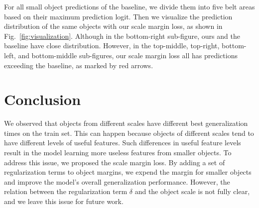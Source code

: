 \documentclass{article}
\begin{document}
For all small object predictions of the baseline, we divide them into five belt areas based on their maximum prediction logit. Then we visualize the prediction distribution of the same objects with our scale margin loss, as shown in Fig.~\ref{fig:visualization}. Although in the bottom-right sub-figure, ours and the baseline have close distribution. However, in the top-middle, top-right, bottom-left, and bottom-middle sub-figures, our scale margin loss all has predictions exceeding the baseline, as marked by red arrows.

\section{Conclusion}


We observed that objects from different scales have different best generalization times on the train set. This can happen because objects of different scales tend to have different levels of useful features. Such differences in useful feature levels result in the model learning more useless features from smaller objects. To address this issue, we proposed the scale margin loss. By adding a set of regularization terms to object margins, we expend the margin for smaller objects and improve the model's overall generalization performance. However, the relation between the regularization term $\delta$ and the object scale is not fully clear, and we leave this issue for future work.



\end{document}
